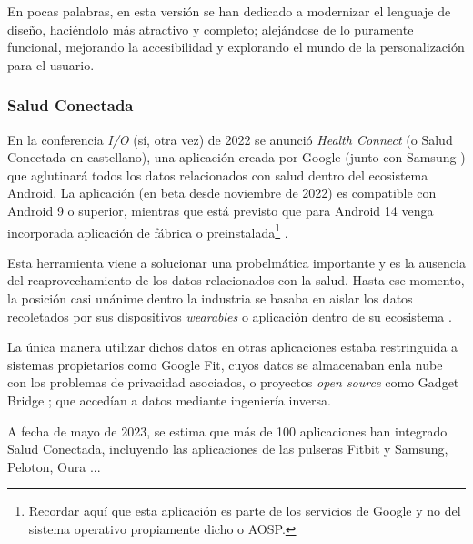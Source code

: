             En pocas palabras, en esta versión se han dedicado a modernizar el lenguaje de diseño, haciéndolo más 
            atractivo y completo; alejándose de lo puramente funcional, mejorando la accesibilidad y explorando 
            el mundo de la personalización para el usuario.

        \subsubsection{Salud Conectada}
            \label{section:salud_conectada}
            En la conferencia \textit{I/O} (sí, otra vez) de 2022 se anunció \textit{Health Connect} (o Salud Conectada
            en castellano), una aplicación creada por Google (junto con Samsung \cite{wilk_introducing_2022}) 
            que aglutinará todos los datos relacionados con salud dentro del ecosistema
            Android. La aplicación (en beta desde noviembre de 2022) es compatible con Android 9 o 
            superior, mientras que está previsto que para Android 14 venga
            incorporada aplicación de fábrica o preinstalada\footnote{Recordar aquí que esta aplicación es
            parte de los servicios de Google y no del sistema operativo propiamente dicho o AOSP.} 
            \cite{pandey_health_2023}. 

            Esta herramienta viene a solucionar una probelmática importante y es la ausencia del reaprovechamiento de 
            los datos relacionados con la salud. Hasta ese momento, la posición casi unánime dentro la 
            industria se basaba en aislar los datos recoletados por sus dispositivos \textit{wearables} o aplicación 
            dentro de su ecosistema \cite{ramirez_android_2022} \cite{rahman_android_2023}. 
            
            La única manera utilizar dichos datos 
            en otras aplicaciones estaba restringuida a sistemas propietarios como Google Fit, cuyos datos se 
            almacenaban enla nube con los problemas de privacidad asociados, o proyectos \textit{open source} como 
            Gadget Bridge \cite{freeyourgadget_gadgetbridge_nodate}; que accedían a datos mediante ingeniería inversa.
            

            A fecha de mayo de 2023, se estima que más de 100 aplicaciones han integrado Salud Conectada, incluyendo
            las aplicaciones de las pulseras Fitbit y Samsung, Peloton, Oura \cite{malik_googles_2023}... 

